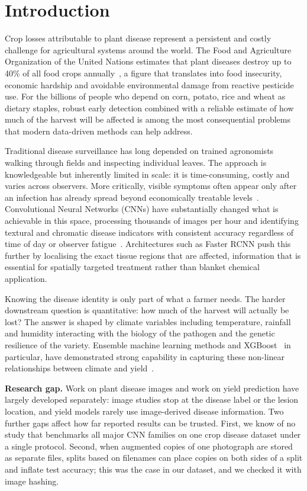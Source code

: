 \section{Introduction}
\label{sec:intro}

Crop losses attributable to plant disease represent a persistent and
costly challenge for agricultural systems around the world.
The Food and Agriculture Organization of the United Nations estimates
that plant diseases destroy up to 40\% of all food crops
annually~\cite{fao2050}, a figure that translates into food insecurity,
economic hardship and avoidable environmental damage from reactive
pesticide use.
For the billions of people who depend on corn, potato, rice and wheat
as dietary staples, robust early detection combined with a reliable
estimate of how much of the harvest will be affected is among the
most consequential problems that modern data-driven methods can help
address.

Traditional disease surveillance has long depended on trained
agronomists walking through fields and inspecting individual leaves.
The approach is knowledgeable but inherently limited in scale: it is
time-consuming, costly and varies across observers. More critically,
visible symptoms often appear only after an infection has already
spread beyond economically treatable levels~\cite{nawaz2023}.
Convolutional Neural Networks (CNNs) have substantially changed what
is achievable in this space, processing thousands of images per hour
and identifying textural and chromatic disease indicators with
consistent accuracy regardless of time of day or observer
fatigue~\cite{das2024}.
Architectures such as Faster RCNN push this further by localising the
exact tissue regions that are affected, information that is essential
for spatially targeted treatment rather than blanket chemical
application.

Knowing the disease identity is only part of what a farmer
needs. The harder downstream question is quantitative: how much of the
harvest will actually be lost? The answer is shaped by climate
variables including temperature, rainfall and humidity interacting with the
biology of the pathogen and the genetic resilience of the variety.
Ensemble machine learning methods and XGBoost~\cite{chen2016xgb} in
particular, have demonstrated strong capability in capturing these
non-linear relationships between climate and yield~\cite{ml_yield_review}.

\noindent\textbf{Research gap.} Work on plant disease images and work on
yield prediction have largely developed separately: image studies stop at
the disease label or the lesion location, and yield models rarely use
image-derived disease information. Two further gaps affect how far
reported results can be trusted. First, we know of no study that
benchmarks all major CNN families on one crop disease dataset under a
single protocol. Second, when augmented copies of one photograph are
stored as separate files, splits based on filenames can place copies on
both sides of a split and inflate test accuracy; this was the case in our
dataset, and we checked it with image hashing.

